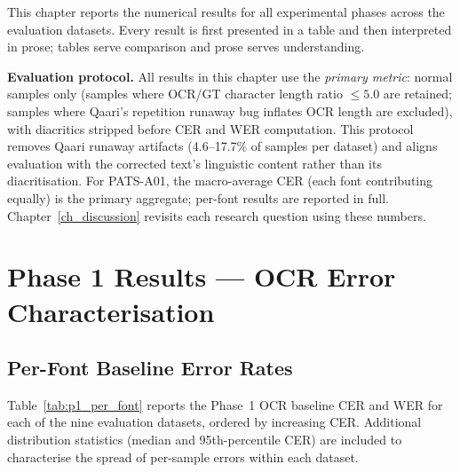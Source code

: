 
This chapter reports the numerical results for all experimental phases
across the evaluation datasets. Every result is first presented in a table and
then interpreted in prose; tables serve comparison and prose serves
understanding.

\textbf{Evaluation protocol.}
All results in this chapter use the \emph{primary metric}: normal samples only
(samples where OCR/GT character length ratio $\leq 5.0$ are retained; samples
where Qaari's repetition runaway bug inflates OCR length are excluded), with
diacritics stripped before CER and WER computation. This protocol removes
Qaari runaway artifacts (4.6--17.7\% of samples per dataset) and aligns
evaluation with the corrected text's linguistic content rather than its
diacritisation. For PATS-A01, the macro-average CER (each font contributing
equally) is the primary aggregate; per-font results are reported in full.
Chapter~\ref{ch_discussion} revisits each research question using these numbers.

\section{Phase 1 Results --- OCR Error Characterisation}
\label{sec:res_phase1}

\subsection{Per-Font Baseline Error Rates}
\label{subsec:res_p1_aggregate}

Table~\ref{tab:p1_per_font} reports the Phase~1 OCR baseline CER and WER
for each of the nine evaluation datasets, ordered by increasing CER.
Additional distribution statistics (median and 95th-percentile CER) are
included to characterise the spread of per-sample errors within each dataset.

